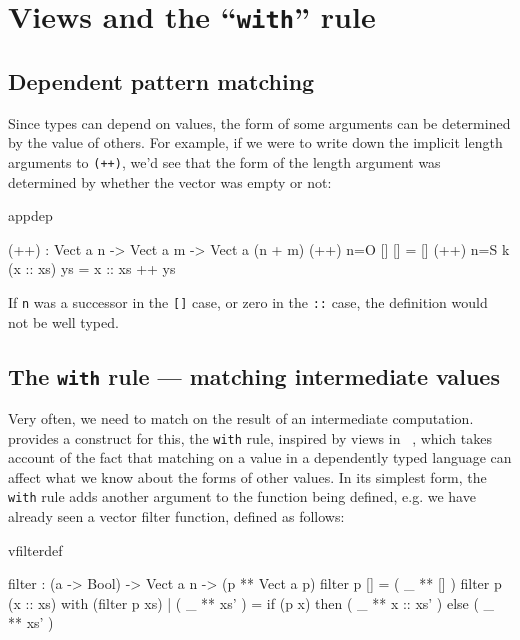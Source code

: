 \section{Views and the ``\texttt{with}'' rule}

\subsection{Dependent pattern matching}

Since types can depend on values, the form of some arguments can be determined
by the value of others. For example, if we were to write down the implicit
length arguments to \texttt{(++)}, we'd see that the form of the length argument was
determined by whether the vector was empty or not:

\begin{SaveVerbatim}{appdep}

(++) : Vect a n -> Vect a m -> Vect a (n + m)
(++) {n=O}   []        [] = []
(++) {n=S k} (x :: xs) ys = x :: xs ++ ys

\end{SaveVerbatim}

\noindent
If \texttt{n} was a successor in the \texttt{[]} case, or zero in the 
\texttt{::} case, the definition
would not be well typed.

\subsection{The \texttt{with} rule --- matching intermediate values}

Very often, we need to match on the result of an intermediate computation.
\Idris{} provides a construct for this, the \texttt{with} rule, 
inspired by views in \Epigram~\cite{view-left},
which takes account of the
fact that matching on a value in a dependently typed language can affect what
we know about the forms of other values. In its simplest form, the \texttt{with} rule
adds another argument to the function being defined, e.g. we have already seen
a vector filter function, defined as follows:

\begin{SaveVerbatim}{vfilterdef}

filter : (a -> Bool) -> Vect a n -> (p ** Vect a p)
filter p [] = ( _ ** [] )
filter p (x :: xs) with (filter p xs)
  | ( _ ** xs' ) = if (p x) then ( _ ** x :: xs' ) else ( _ ** xs' )

\end{SaveVerbatim}

